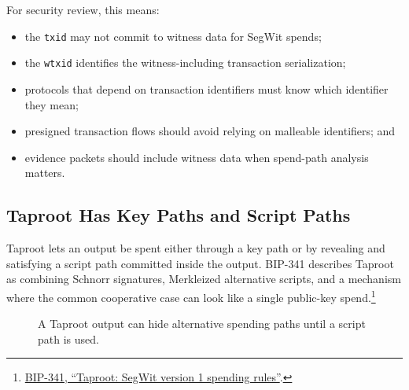 For security review, this means:

\begin{itemize}
\item the \texttt{txid} may not commit to witness data for SegWit spends;
\item the \texttt{wtxid} identifies the witness-including transaction serialization;
\item protocols that depend on transaction identifiers must know which identifier they mean;
\item presigned transaction flows should avoid relying on malleable identifiers; and
\item evidence packets should include witness data when spend-path analysis matters.
\end{itemize}

\subsection{Taproot Has Key Paths and Script Paths}

Taproot lets an output be spent either through a key path or by revealing and satisfying a script path committed inside the output. BIP-341 describes Taproot as combining Schnorr signatures, Merkleized alternative scripts, and a mechanism where the common cooperative case can look like a single public-key spend.\footnote{\href{https://github.com/bitcoin/bips/blob/master/bip-0341.mediawiki}{BIP-341, ``Taproot: SegWit version 1 spending rules''}.}

\begin{figure}[htbp]
\centering
{}
\caption{A Taproot output can hide alternative spending paths until a script path is used.}
\end{figure}

